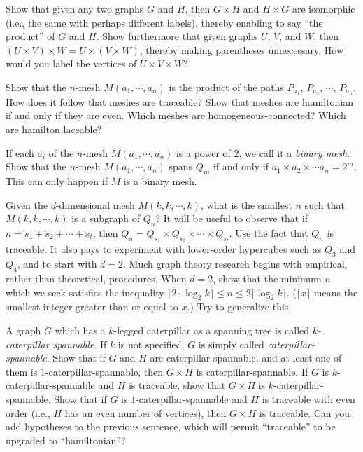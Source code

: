 \documentclass{article}
\begin{document}
\begin{description}
  Show that given any two graphs $G$ and $H$, then $G \times H$ and $H \times G$ are isomorphic (i.e., the same with perhaps different labels), thereby enabling to say ``the product'' of $G$ and $H$. Show furthermore that given graphs $U$, $V$, and $W$, then $(U \times V) \times W = U \times (V \times W)$, thereby making parentheses unnecessary. How would you label the vertices of $U \times V \times W$?

  Show that the $n$-mesh $M(a_1,\cdots,a_n)$ is the product of the paths $P_{a_1}$, $P_{a_2}$, $\cdots$, $P_{a_n}$. How does it follow that meshes are traceable? Show that meshes are hamiltonian if and only if they are even. Which meshes are homogeneous-connected? Which are hamilton laceable?

\item[29.] If each $a_i$ of the $n$-mesh $M(a_1,\cdots,a_n)$ is a power of $2$, we call it a \emph{binary mesh}. Show that the $n$-mesh $M(a_1,\cdots,a_n)$ spans $Q_m$ if and only if $a_1 \times a_2 \times \cdots a_n = 2^m$. This can only happen if $M$ is a binary mesh.

\item[30.] Given the $d$-dimensional mesh $M(k,k,\cdots,k)$, what is the smallest $n$ such that $M(k,k,\cdots,k)$ is a subgraph of $Q_n$? It will be useful to observe that if $n = s_1 + s_2 + \cdots + s_t$, then $Q_n = Q_{s_1} \times Q_{s_2} \times \cdots \times Q_{s_t}$. Use the fact that $Q_n$ is traceable. It also pays to experiment with lower-order hypercubes such as $Q_3$ and $Q_4$, and to start with $d = 2$. Much graph theory research begins with empirical, rather than theoretical, procedures. When $d = 2$, show that the minimum $n$ which we seek satisfies the inequality $\lceil 2 \cdot \log_2k \rceil \leq n \leq 2 \lceil \log_2k \rceil$. ($\lceil x \rceil$ means the smallest integer greater than or equal to $x$.) Try to generalize this.

\item[31.] A graph $G$ which has a $k$-legged caterpillar as a spanning tree is called \emph{$k$-caterpillar spannable}. If $k$ is not specified, $G$ is simply called \emph{caterpillar-spannable}. Show that if $G$ and $H$ are caterpillar-spannable, and at least one of them is $1$-caterpillar-spannable, then $G \times H$ is caterpillar-spannable. If $G$ is $k$-caterpillar-spannable and $H$ is traceable, show that $G \times H$ is $k$-caterpillar-spannable. Show that if $G$ is $1$-caterpillar-spannable and $H$ is traceable with even order (i.e., $H$ has an even number of vertices), then $G \times H$ is traceable. Can you add hypotheses to the previous sentence, which will permit ``traceable'' to be upgraded to ``hamiltonian''?


\end{description}
\end{document}
